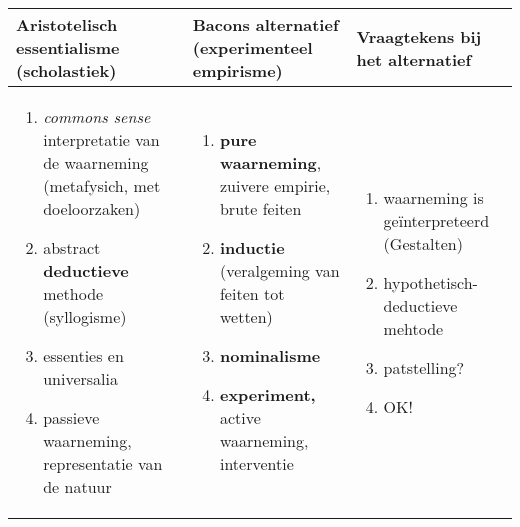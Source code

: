 \begin{flushleft}
\begin{tabular}{p{6cm} p{5cm} p{4cm}}
	\hline
	
	 \raggedright Aristotelisch essentialisme (scholastiek) & Bacons alternatief (experimenteel empirisme) & Vraagtekens bij het alternatief\\
	\hline
	\begin{flushleft}
	\begin{enumerate}
	
	\item \textit{commons sense} interpretatie van de waarneming (metafysich, met doeloorzaken)
	\item abstract \textbf{deductieve} methode (syllogisme)
	\item essenties en universalia
	\item passieve waarneming, representatie van de natuur
	\end{enumerate}	 
	\end{flushleft}
	
	&
	\begin{flushleft}
	\begin{enumerate}
	\item \textbf{pure waarneming}, zuivere empirie, brute feiten
	\item \textbf{inductie} (veralgeming van feiten tot wetten)
	\item \textbf{nominalisme}
	\item \textbf{experiment,} active waarneming, interventie
	\end{enumerate}
	\end{flushleft}
	&
	
	\begin{flushleft}
	\begin{enumerate}
	
	\item waarneming is ge\"interpreteerd (Gestalten)
	\item hypothetisch- deductieve mehtode
	\item patstelling?
	\item OK!
	
	\end{enumerate}
	\end{flushleft}

	\\
	
	\hline
	
\end{tabular}
\end{flushleft}
